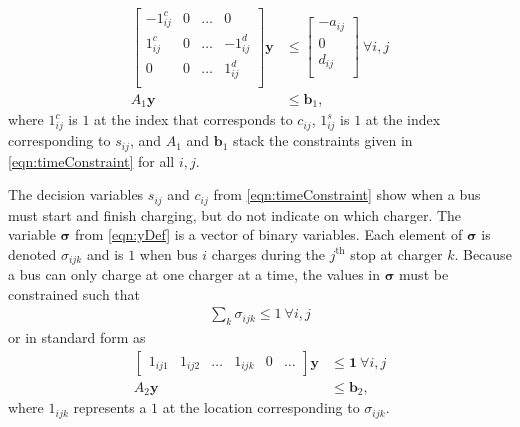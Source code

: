 \begin{equation} \begin{aligned}
	\begin{bmatrix}
		-1^c_{ij} & 0 & \hdots &  0        \\
	         1^c_{ij} & 0 & \hdots & -1^d_{ij} \\
		 0        & 0 & \hdots &  1^d_{ij} \\ 
	\end{bmatrix}
	\mathbf{y} &\le 
	\begin{bmatrix}
	        -a_{ij} \\ 
		 0      \\ 
		 d_{ij} \\
	\end{bmatrix} \ \forall i,j \\
	A_1\mathbf{y} &\le \mathbf{b}_1,
\end{aligned} \end{equation}
	where $1^{c}_{ij}$ is $1$ at the index that corresponds to $c_{ij}$, $1^s_{ij}$ is $1$ at the index corresponding to $s_{ij}$, and $A_1$ and $\mathbf{b}_1$ stack the constraints given in \eqref{eqn:timeConstraint} for all $i,j$.
	\par The decision variables $s_{ij}$ and $c_{ij}$ from \eqref{eqn:timeConstraint} show when a bus must start and finish charging, but do not indicate on which charger. The variable $\boldsymbol{\sigma}$ from \eqref{eqn:yDef} is a vector of binary variables. Each element of $\boldsymbol{\sigma}$ is denoted $\sigma_{ijk}$ and is $1$ when bus $i$ charges during the $j^{\text{th}}$ stop at charger $k$. Because a bus can only charge at one charger at a time, the values in $\boldsymbol{\sigma}$ must be constrained such that
\begin{equation}
	\begin{aligned}
		\sum_k \sigma_{ijk} \le 1 \ \forall i,j
	\end{aligned}
\end{equation} 
or in standard form as 
\begin{equation} \begin{aligned}
	\begin{bmatrix}1_{ij1} & 1_{ij2} & \hdots & 1_{ijk} & 0 & \hdots \end{bmatrix} \mathbf{y} &\le \mathbf{1} \ \forall i,j\\
		A_2\mathbf{y} & \le \mathbf{b}_2,
\end{aligned} \end{equation}
where $1_{ijk}$ represents a $1$ at the location corresponding to $\sigma_{ijk}$.
